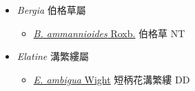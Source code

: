 
  \begin{itemize}
 \item[] \textit{Bergia} 伯格草屬
                                
  \begin{itemize}
        \item[] \href{http://www.theplantlist.org/tpl1.1/search?q=Bergia+ammannioides}{\textit{B. ammannioides} Roxb.}   伯格草   NT
  \end{itemize}
 \item[] \textit{Elatine} 溝繁縷屬
                                
  \begin{itemize}
        \item[] \href{http://www.theplantlist.org/tpl1.1/search?q=Elatine+ambigua}{\textit{E. ambigua} Wight}   短柄花溝繁縷   DD
  \end{itemize}
  \end{itemize}
